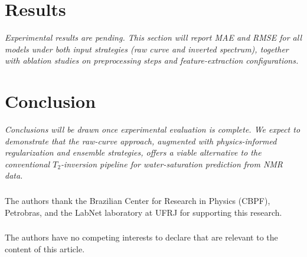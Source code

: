 \documentclass[runningheads]{llncs}
\begin{document}
\section{Results}
\label{sec:results}


\textit{Experimental results are pending. This section will report MAE and RMSE for all models
under both input strategies (raw curve and inverted spectrum), together with ablation studies
on preprocessing steps and feature-extraction configurations.}

\section{Conclusion}
\label{sec:conclusion}


\textit{Conclusions will be drawn once experimental evaluation is complete. We expect to
demonstrate that the raw-curve approach, augmented with physics-informed regularization and
ensemble strategies, offers a viable alternative to the conventional $T_2$-inversion pipeline
for water-saturation prediction from NMR data.}

\begin{credits}
\subsubsection{\ackname}
The authors thank the Brazilian Center for Research in Physics (CBPF),
Petrobras, and the LabNet laboratory at UFRJ for supporting this research.

\subsubsection{\discintname}
The authors have no competing interests to declare that are relevant to the
content of this article.
\end{credits}
\end{document}
